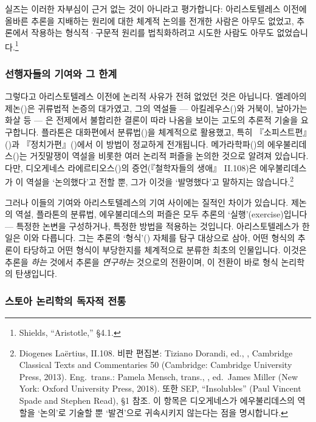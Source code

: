 \documentclass[12pt, a4paper]{article}
\begin{document}
실즈는 이러한 자부심이 근거 없는 것이 아니라고 평가합니다: 아리스토텔레스 이전에 올바른 추론을 지배하는 원리에 대한 체계적 논의를 전개한 사람은 아무도 없었고, 추론에서 작용하는 형식적·구문적 원리를 법칙화하려고 시도한 사람도 아무도 없었습니다.\footnote{Shields, ``Aristotle,'' §4.1.}

\subsubsection{선행자들의 기여와 그 한계}

그렇다고 아리스토텔레스 이전에 논리적 사유가 전혀 없었던 것은 아닙니다. 엘레아의 제논()은 귀류법적 논증의 대가였고, 그의 역설들 --- 아킬레우스()와 거북이, 날아가는 화살 등 --- 은 전제에서 불합리한 결론이 따라 나옴을 보이는 고도의 추론적 기술을 요구합니다. 플라톤은 대화편에서 분류법()을 체계적으로 활용했고, 특히 『소피스트편』()과 『정치가편』()에서 이 방법이 정교하게 전개됩니다. 메가라학파()의 에우불리데스()는 거짓말쟁이 역설을 비롯한 여러 논리적 퍼즐을 논의한 것으로 알려져 있습니다. 다만, 디오게네스 라에르티오스()의 증언(『철학자들의 생애』 II.108)은 에우불리데스가 이 역설을 `논의했다'고 전할 뿐, 그가 이것을 `발명했다'고 말하지는 않습니다.\footnote{Diogenes La\"ertius,  II.108. 비판 편집본: Tiziano Dorandi, ed., , Cambridge Classical Texts and Commentaries 50 (Cambridge: Cambridge University Press, 2013). Eng.\ trans.: Pamela Mensch, trans., , ed.\ James Miller (New York: Oxford University Press, 2018). 또한 SEP, ``Insolubles'' (Paul Vincent Spade and Stephen Read), §1 참조. 이 항목은 디오게네스가 에우불리데스의 역할을 `논의'로 기술할 뿐 `발견'으로 귀속시키지 않는다는 점을 명시합니다.}

그러나 이들의 기여와 아리스토텔레스의 기여 사이에는 질적인 차이가 있습니다. 제논의 역설, 플라톤의 분류법, 에우불리데스의 퍼즐은 모두 추론의 `실행'(exercise)입니다 --- 특정한 논변을 구성하거나, 특정한 방법을 적용하는 것입니다. 아리스토텔레스가 한 일은 이와 다릅니다. 그는 추론의 `형식'() 자체를 탐구 대상으로 삼아, 어떤 형식의 추론이 타당하고 어떤 형식이 부당한지를 체계적으로 분류한 최초의 인물입니다. 이것은 추론을 \emph{하는} 것에서 추론을 \emph{연구하는} 것으로의 전환이며, 이 전환이 바로 형식 논리학의 탄생입니다.

\subsubsection{스토아 논리학의 독자적 전통}
\end{document}
